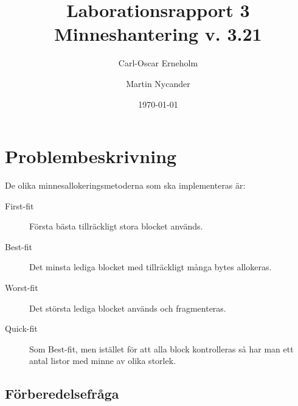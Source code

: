 \documentclass[a4paper,10pt,titlepage]{article}
\title{Laborationsrapport 3 \\ Minneshantering v. 3.21}
\author{Carl-Oscar Erneholm \and Martin Nycander}
\date{\today}
\begin{document}


\maketitle

\tableofcontents
\thispagestyle{empty}
\newpage
\setcounter{page}{1}
\section{Problembeskrivning}

De olika minnesallokeringsmetoderna som ska implementeras är:

\begin{description}
	\item[First-fit] Första bästa tillräckligt stora blocket används.
	\item[Best-fit] Det minsta lediga blocket med tillräckligt många bytes allokeras.
	\item[Worst-fit] Det största lediga blocket används och fragmenteras.
	\item[Quick-fit] Som Best-fit, men istället för att alla block kontrolleras så har man ett antal listor med minne av olika storlek.
\end{description}

\subsection{Förberedelsefråga}
\end{document}
